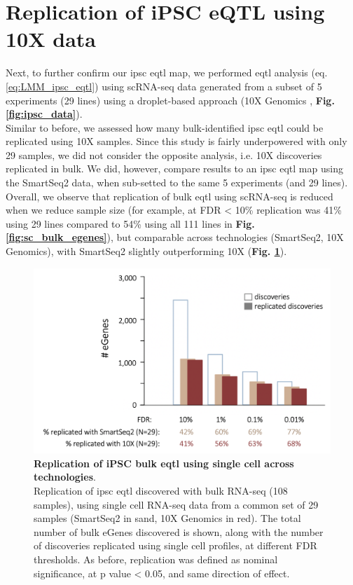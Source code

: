 \newpage

\section{Replication of iPSC eQTL using 10X data}

Next, to further confirm our \gls{ipsc} \gls{eqtl} map, we performed \gls{eqtl} analysis (eq. \eqref{eq:LMM_ipsc_eqtl}) using scRNA-seq data generated from a subset of 5 experiments (29 lines) using a droplet-based approach (10X Genomics \cite{zheng2017massively}, \textbf{Fig. \ref{fig:ipsc_data}}).\\

Similar to before, we assessed how many bulk-identified \gls{ipsc} \gls{eqtl} could be replicated using 10X samples.
Since this study is fairly underpowered with only 29 samples, we did not consider the opposite analysis, i.e. 10X discoveries replicated in bulk.
We did, however, compare results to an \gls{ipsc} \gls{eqtl} map using the SmartSeq2 data, when sub-setted to the same 5 experiments (and 29 lines). \\

Overall, we observe that replication of bulk \gls{eqtl} using scRNA-seq is reduced when we reduce sample size (for example, at FDR < 10\% replication was 41\% using 29 lines compared to 54\% using all 111 lines in \textbf{Fig. \ref{fig:sc_bulk_egenes}}), but comparable across technologies (SmartSeq2, 10X Genomics), with SmartSeq2 slightly outperforming 10X (\textbf{Fig. \ref{fig:sc_bulk_10x_egenes}}).

\begin{figure}[h]
\includegraphics[width=14.5cm]{Chapter3/Fig/sc_vs_bulk_vs_10x.png}
\caption[iPSC bulk eQTL replication]{\textbf{Replication of iPSC bulk \gls{eqtl} using single cell across technologies}.\\
Replication of \gls{ipsc} \gls{eqtl} discovered with bulk RNA-seq (108 samples), using single cell RNA-seq data from a common set of 29 samples (SmartSeq2 in sand, 10X Genomics in red). 
The total number of bulk eGenes discovered is shown, along with the number of discoveries replicated using single cell profiles, at different FDR thresholds. 
As before, replication was defined as nominal significance, at p value < 0.05, and same direction of effect.}
\label{fig:sc_bulk_10x_egenes}
\end{figure}

